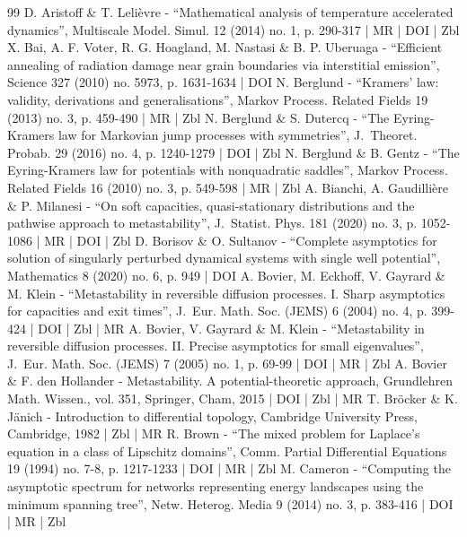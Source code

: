 \documentclass[10pt]{amsart}
\theoremstyle{plain}
\theoremstyle{definition}
\begin{document}
\vspace*{\baselineskip}\vskip0pt


\begin{thebibliography}{99}
D. Aristoff \& T. Lelièvre - “Mathematical analysis of temperature accelerated dynamics”, Multiscale Model. Simul. 12 (2014) no. 1, p. 290-317 | MR | DOI | Zbl
X. Bai, A. F. Voter, R. G. Hoagland, M. Nastasi \& B. P. Uberuaga - “Efficient annealing of radiation damage near grain boundaries via interstitial emission”, Science 327 (2010) no. 5973, p. 1631-1634 | DOI
N. Berglund - “Kramers’ law: validity, derivations and generalisations”, Markov Process. Related Fields 19 (2013) no. 3, p. 459-490 | MR | Zbl
N. Berglund \& S. Dutercq - “The Eyring-Kramers law for Markovian jump processes with symmetries”, J. Theoret. Probab. 29 (2016) no. 4, p. 1240-1279 | DOI | Zbl
N. Berglund \& B. Gentz - “The Eyring-Kramers law for potentials with nonquadratic saddles”, Markov Process. Related Fields 16 (2010) no. 3, p. 549-598 | MR | Zbl
A. Bianchi, A. Gaudillière \& P. Milanesi - “On soft capacities, quasi-stationary distributions and the pathwise approach to metastability”, J. Statist. Phys. 181 (2020) no. 3, p. 1052-1086 | MR | DOI | Zbl
D. Borisov \& O. Sultanov - “Complete asymptotics for solution of singularly perturbed dynamical systems with single well potential”, Mathematics 8 (2020) no. 6, p. 949 | DOI
A. Bovier, M. Eckhoff, V. Gayrard \& M. Klein - “Metastability in reversible diffusion processes. I. Sharp asymptotics for capacities and exit times”, J. Eur. Math. Soc. (JEMS) 6 (2004) no. 4, p. 399-424 | DOI | Zbl | MR
A. Bovier, V. Gayrard \& M. Klein - “Metastability in reversible diffusion processes. II. Precise asymptotics for small eigenvalues”, J. Eur. Math. Soc. (JEMS) 7 (2005) no. 1, p. 69-99 | DOI | MR | Zbl
A. Bovier \& F. den Hollander - Metastability. A potential-theoretic approach, Grundlehren Math. Wissen., vol. 351, Springer, Cham, 2015 | DOI | Zbl | MR
T. Bröcker \& K. Jänich - Introduction to differential topology, Cambridge University Press, Cambridge, 1982 | Zbl | MR
R. Brown - “The mixed problem for Laplace’s equation in a class of Lipschitz domains”, Comm. Partial Differential Equations 19 (1994) no. 7-8, p. 1217-1233 | DOI | MR | Zbl
M. Cameron - “Computing the asymptotic spectrum for networks representing energy landscapes using the minimum spanning tree”, Netw. Heterog. Media 9 (2014) no. 3, p. 383-416 | DOI | MR | Zbl

\end{thebibliography}
\end{document}
